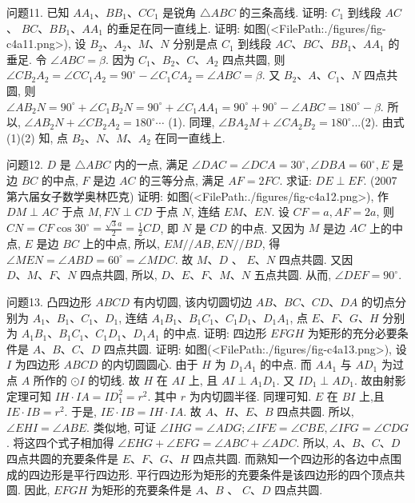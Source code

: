 问题11. 已知 $A A_1 、 B B_1 、 C C_1$ 是锐角 $\triangle A B C$ 的三条高线.
证明: $C_1$ 到线段 $A C$ 、 $B C 、 B B_1 、 A A_1$ 的垂足在同一直线上.
证明: 如图(<FilePath:./figures/fig-c4a11.png>), 设 $B_2 、 A_2 、 M 、 N$ 分别是点 $C_1$ 到线段 $A C 、 B C 、 B B_1 、 A A_1$ 的垂足.
令 $\angle A B C=\beta$. 因为 $C_1 、 B_2 、 C 、 A_2$ 四点共圆, 则 $\angle C B_2 A_2=\angle C C_1 A_2= 90^{\circ}-\angle C_1 C A_2=\angle A B C=\beta$. 又 $B_2 、 A 、 C_1 、 N$ 四点共圆, 则 $\angle A B_2 N=90^{\circ}+\angle C_1 B_2 N=90^{\circ}+\angle C_1 A A_1= 90^{\circ}+90^{\circ}-\angle A B C=180^{\circ}-\beta$. 所以, $\angle A B_2 N+\angle C B_2 A_2=180^{\circ} \cdots$ (1). 同理, $\angle B A_2 M+\angle C A_2 B_2= 180^{\circ}$...(2). 由式 (1)(2) 知, 点 $B_2 、 N 、 M 、 A_2$ 在同一直线上.



问题12. $D$ 是 $\triangle A B C$ 内的一点, 满足 $\angle D A C=\angle D C A=30^{\circ}, \angle D B A=60^{\circ}, E$ 是边 $B C$ 的中点, $F$ 是边 $A C$ 的三等分点, 满足 $A F=2 F C$. 求证: $D E \perp E F$. (2007 第六届女子数学奥林匹克)
证明: 如图(<FilePath:./figures/fig-c4a12.png>), 作 $D M \perp A C$ 于点 $M, F N \perp C D$ 于点 $N$, 连结 $E M 、 E N$. 设 $C F=a, A F= 2 a$, 则 $C N=C F \cos 30^{\circ}=\frac{\sqrt{3} a}{2}=\frac{1}{2} C D$, 即 $N$ 是 $C D$ 的中点.
又因为 $M$ 是边 $A C$ 上的中点, $E$ 是边 $B C$ 上的中点, 所以, $E M / / A B, E N / / B D$, 得 $\angle M E N=\angle A B D=60^{\circ}=\angle M D C$. 故 $M 、 D$ 、 $E 、 N$ 四点共圆.
又因 $D 、 M 、 F 、 N$ 四点共圆, 所以, $D 、 E 、 F 、 M 、 N$ 五点共圆.
从而, $\angle D E F=90^{\circ}$.



问题13. 凸四边形 $A B C D$ 有内切圆, 该内切圆切边 $A B 、 B C 、 C D 、 D A$ 的切点分别为 $A_1 、 B_1 、 C_1 、 D_1$, 连结 $A_1 B_1 、 B_1 C_1 、 C_1 D_1 、 D_1 A_1$, 点 $E 、 F 、 G 、 H$ 分别为 $A_1 B_1 、 B_1 C_1 、 C_1 D_1 、 D_1 A_1$ 的中点.
证明: 四边形 $E F G H$ 为矩形的充分必要条件是 $A 、 B 、 C 、 D$ 四点共圆.
证明: 如图(<FilePath:./figures/fig-c4a13.png>), 设 $I$ 为四边形 $A B C D$ 的内切圆圆心.
由于 $H$ 为 $D_1 A_1$ 的中点.
而 $A A_1$ 与 $A D_1$ 为过点 $A$ 所作的 $\odot I$ 的切线.
故 $H$ 在 $A I$ 上, 且 $A I \perp A_1 D_1$. 又 $I D_1 \perp A D_1$. 故由射影定理可知 $I H \cdot I A=I D_1^2=r^2$. 其中 $r$ 为内切圆半径.
同理可知.
$E$ 在 $B I$ 上,且 $I E \cdot I B= r^2$. 于是, $I E \cdot I B=I H \cdot I A$. 故 $A 、 H 、 E 、 B$ 四点共圆.
所以, $\angle E H I=\angle A B E$. 类似地, 可证 $\angle I H G= \angle A D G ; \angle I F E=\angle C B E, \angle I F G=\angle C D G$. 将这四个式子相加得 $\angle E H G+\angle E F G=\angle A B C+\angle A D C$. 所以, $A 、 B 、 C 、 D$ 四点共圆的充要条件是 $E 、 F 、 G 、 H$ 四点共圆.
而熟知一个四边形的各边中点围成的四边形是平行四边形.
平行四边形为矩形的充要条件是该四边形的四个顶点共圆.
因此, $E F G H$ 为矩形的充要条件是 $A 、 B$ 、 $C 、 D$ 四点共圆.



